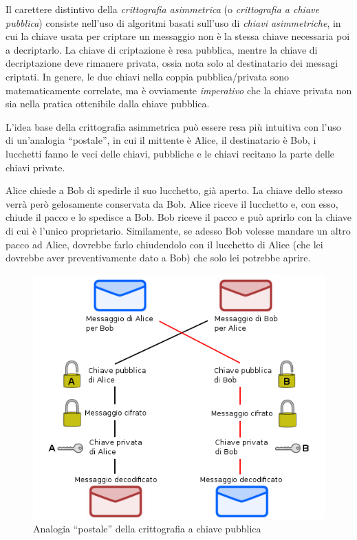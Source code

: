 \documentclass[pdflatex,11pt,a4paper,oneside]{article}
\let\OldEmph\emph
\renewcommand{\emph}[1]{\OldEmph{#1\/}}
\begin{document}
Il carettere distintivo della \emph{crittografia asimmetrica} (o
\emph{crittografia a chiave pubblica}) consiste nell'uso di algoritmi
basati sull'uso di \emph{chiavi asimmetriche}, in cui la chiave usata
per criptare un messaggio non \`e la stessa chiave necessaria poi a
decriptarlo.  La chiave di criptazione \`e resa pubblica, mentre la chiave
di decriptazione deve rimanere privata, ossia nota solo al destinatario
dei messagi criptati. In genere, le due chiavi nella coppia
pubblica/privata sono matematicamente correlate, ma \`e ovviamente
\emph{imperativo} che la chiave privata non sia nella pratica ottenibile
dalla chiave pubblica.

\medskip
L'idea base della crittografia asimmetrica pu\`o essere resa pi\`u
intuitiva con l'uso di un'analogia ``postale'', in cui il mittente \`e
Alice, il destinatario \`e Bob, i lucchetti fanno le veci delle chiavi,
pubbliche e le chiavi recitano la parte delle chiavi private.

Alice chiede a Bob di spedirle il suo lucchetto, gi\`a aperto. La chiave
dello stesso verr\`a per\`o gelosamente conservata da Bob. Alice riceve
il lucchetto e, con esso, chiude il pacco e lo spedisce a Bob. Bob riceve
il pacco e pu\`o aprirlo con la chiave di cui \`e l'unico proprietario.
Similamente, se adesso Bob volesse mandare un altro pacco ad Alice,
dovrebbe farlo chiudendolo con il lucchetto di Alice (che lei dovrebbe
aver preventivamente dato a Bob) che solo lei potrebbe aprire.

\begin{figure}[!h]
  \centering
    \includegraphics[scale=0.5]{pubkey-postal-analogy}
    \caption{Analogia ``postale'' della crittografia a chiave pubblica}
    \label{fig:pubkey-postal-analogy}
\end{figure}
\end{document}
